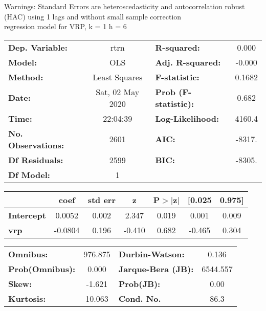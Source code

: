 Warnings: \newline
 [1] Standard Errors are heteroscedasticity and autocorrelation robust (HAC) using 1 lags and without small sample correction\\ 

regression model for VRP, k = 1 h = 6\begin{center}
\begin{tabular}{lclc}
\toprule
\textbf{Dep. Variable:}    &       rtrn       & \textbf{  R-squared:         } &     0.000   \\
\textbf{Model:}            &       OLS        & \textbf{  Adj. R-squared:    } &    -0.000   \\
\textbf{Method:}           &  Least Squares   & \textbf{  F-statistic:       } &    0.1682   \\
\textbf{Date:}             & Sat, 02 May 2020 & \textbf{  Prob (F-statistic):} &    0.682    \\
\textbf{Time:}             &     22:04:39     & \textbf{  Log-Likelihood:    } &    4160.4   \\
\textbf{No. Observations:} &        2601      & \textbf{  AIC:               } &    -8317.   \\
\textbf{Df Residuals:}     &        2599      & \textbf{  BIC:               } &    -8305.   \\
\textbf{Df Model:}         &           1      & \textbf{                     } &             \\
\bottomrule
\end{tabular}
\begin{tabular}{lcccccc}
                   & \textbf{coef} & \textbf{std err} & \textbf{z} & \textbf{P$> |$z$|$} & \textbf{[0.025} & \textbf{0.975]}  \\
\midrule
\textbf{Intercept} &       0.0052  &        0.002     &     2.347  &         0.019        &        0.001    &        0.009     \\
\textbf{vrp}       &      -0.0804  &        0.196     &    -0.410  &         0.682        &       -0.465    &        0.304     \\
\bottomrule
\end{tabular}
\begin{tabular}{lclc}
\textbf{Omnibus:}       & 976.875 & \textbf{  Durbin-Watson:     } &    0.136  \\
\textbf{Prob(Omnibus):} &   0.000 & \textbf{  Jarque-Bera (JB):  } & 6544.557  \\
\textbf{Skew:}          &  -1.621 & \textbf{  Prob(JB):          } &     0.00  \\
\textbf{Kurtosis:}      &  10.063 & \textbf{  Cond. No.          } &     86.3  \\
\bottomrule
\end{tabular}
\end{center}

